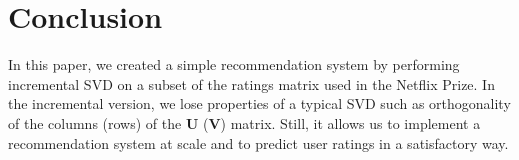 \documentclass{article} %
\begin{document}
\section{Conclusion}
In this paper, we created a simple recommendation system by performing incremental SVD on a subset of the ratings matrix used in the Netflix Prize.
In the incremental version, we lose properties of a typical SVD such as orthogonality of the columns (rows) of the $\mathbf{U}$ ($\mathbf{V}$) matrix.
Still, it allows us to implement a recommendation system at scale and to predict user ratings in a satisfactory way.




\end{document}
